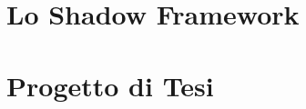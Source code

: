 \documentclass[11pt,a4paper]{book}
\begin{document}





\part{Lo Shadow Framework}
\label{prt:shadowframework}


\part{Progetto di Tesi}
\label{prt:progetto}




\end{document}
